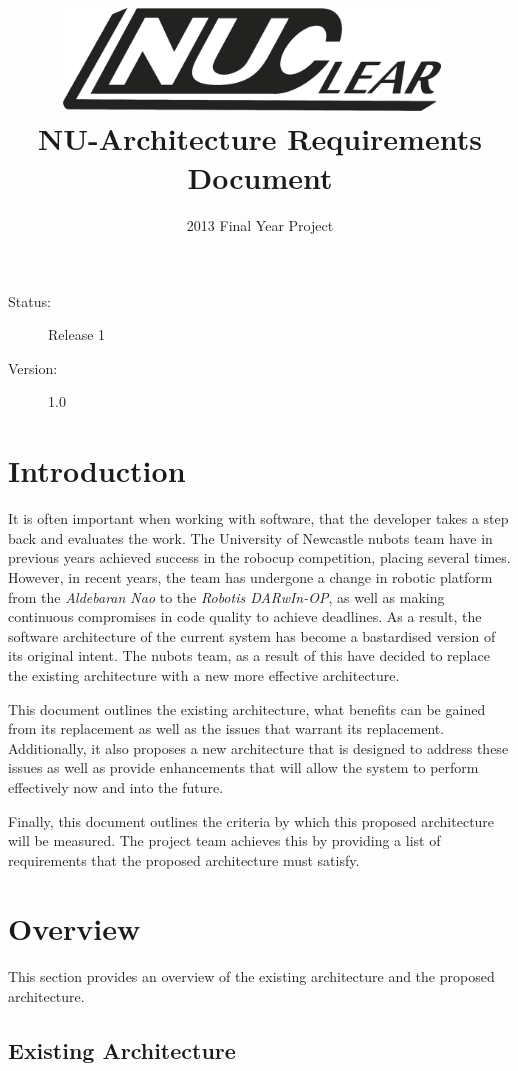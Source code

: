 \documentclass[english,12pt]{scrartcl}
\title{\includegraphics[width=0.75\textwidth]{./Logo/NUClear-logo}~\\[1cm] NU-Architecture Requirements Document}
\author{2013 Final Year Project}
\begin{document}
	\maketitle
	\vfill
	{\large
		\begin{description}
			\item [Status:] Release 1
			\item [Version:] 1.0
		\end{description}}

	\clearpage
	\tableofcontents
	\clearpage
		
	\section{Introduction}
		It is often important when working with software, that the developer takes a step back and evaluates the work.
		The University of Newcastle \gls{nubots} team have in previous years achieved success in the \gls{robocup} competition, placing several times.
		However, in recent years, the team has undergone a change in robotic platform from the \emph{Aldebaran Nao} to the \emph{Robotis DARwIn-OP}, as well as making continuous compromises in code quality to achieve deadlines.
		As a result, the software architecture of the current system has become a bastardised version of its original intent.
		The \gls{nubots} team, as a result of this have decided to replace the existing architecture with a new more effective architecture.
		
		This document outlines the existing architecture, what benefits can be gained from its replacement as well as the issues that warrant its replacement.
		Additionally, it also proposes a new architecture that is designed to address these issues as well as provide enhancements that will allow the system to perform effectively now and into the future.
		
		Finally, this document outlines the criteria by which this proposed architecture will be measured. The project team achieves this by providing a list of requirements that the proposed architecture must satisfy.

	\section{Overview}
		This section provides an overview of the existing architecture and the proposed architecture.

		\subsection{Existing Architecture}
\end{document}
